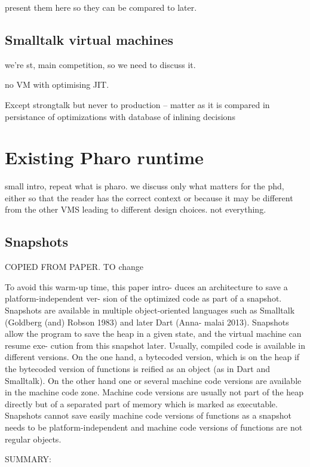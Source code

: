 \documentclass[a4paper,12pt,twoside]{../includes/ThesisStyle}
\begin{document}
present them here so they can be compared to later.

\subsection{Smalltalk virtual machines}

we're st, main competition, so we need to discuss it.

no VM with optimising JIT.

Except strongtalk but never to production
-- matter as it is compared in persistance of optimizations with database of inlining decisions

\section{Existing Pharo runtime}

small intro, repeat what is pharo. we discuss only what matters for the phd, either so that the reader has the correct context or because it may be different from the other VMS leading to different design choices. not everything.

\subsection{Snapshots}

COPIED FROM PAPER. TO change

To avoid this warm-up time, this paper intro- duces an architecture to save a platform-independent ver- sion of the optimized code as part of a snapshot. Snapshots are available in multiple object-oriented languages such as Smalltalk (Goldberg (and) Robson 1983) and later Dart (Anna- malai 2013). Snapshots allow the program to save the heap in a given state, and the virtual machine can resume exe- cution from this snapshot later. Usually, compiled code is available in different versions. On the one hand, a bytecoded version, which is on the heap if the bytecoded version of functions is reified as an object (as in Dart and Smalltalk). On the other hand one or several machine code versions are available in the machine code zone. Machine code versions are usually not part of the heap directly but of a separated part of memory which is marked as executable. Snapshots cannot save easily machine code versions of functions as a snapshot needs to be platform-independent and machine code versions of functions are not regular objects.

SUMMARY:
\end{document}
